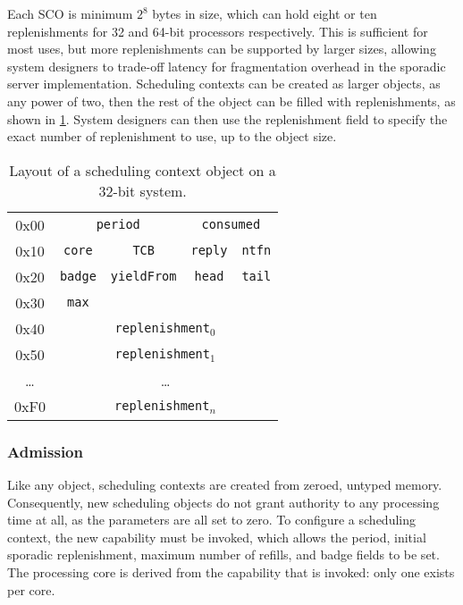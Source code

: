 Each \gls{SCO} is minimum $2^{8}$ bytes in size, which can hold eight or ten replenishments for 32
and 64-bit processors respectively. This is sufficient for most uses, but more replenishments can
be supported by larger sizes, allowing system designers to trade-off latency for fragmentation
overhead in the sporadic server implementation. Scheduling contexts can be created as larger
objects, as any power of two, then the rest of the object can be filled with replenishments, as
shown in \cref{t:impl-sc-layout}. System designers can then use the  replenishment field
to specify the exact number of replenishment to use, up to the object size. 

\begin{table}[t] 
    \centering
    \begin{tabular}{c|c|c|c|c|}\cline{2-5}
        0x00 &  \multicolumn{2}{c}{\texttt{period}} & \multicolumn{2}{|c|}{\texttt{consumed}}
        \\\cline{2-5}
        0x10 & \texttt{core}                         & \texttt{TCB} & \texttt{reply} & \texttt{ntfn} \\\cline{2-5}
        0x20 &\texttt{badge}                        & \texttt{yieldFrom}                               & \texttt{head}  & \texttt{tail} \\\cline{2-5}
        0x30 & \texttt{max}                          &                                                  &                & \\\cline{2-5}
        0x40 & \multicolumn{4}{c|}{\texttt{replenishment$_{0}$}}  \\\cline{2-5}
        0x50 & \multicolumn{4}{c|}{\texttt{replenishment$_{1}$}}  \\\cline{2-5}
        \ldots & \multicolumn{4}{c|}{\ldots}  \\\cline{2-5}
        0xF0 & \multicolumn{4}{c|}{\texttt{replenishment$_{n}$}}  \\\cline{2-5}


    \end{tabular}
    \caption{Layout of a scheduling context object on a 32-bit system.}
    \label{t:impl-sc-layout}
\end{table}

\subsubsection{Admission}

Like any \selfour object, scheduling contexts are created from zeroed, untyped memory. Consequently,
new scheduling objects do not grant authority to any processing time at all, as the parameters are
all set to zero. To configure a scheduling context, the new \schedcontrol capability must be
invoked, which allows the period, initial sporadic replenishment, maximum number of refills, and
badge fields to be set. The processing core is derived from the \schedcontrol capability
that is invoked: only one exists per core. 


